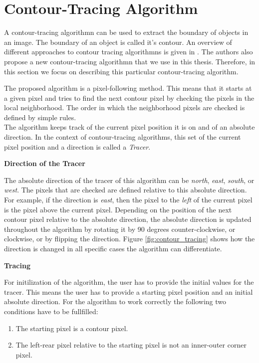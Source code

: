 \documentclass[thesis.tex]{subfiles}
\begin{document}
\section{Contour-Tracing Algorithm} 
\label{contourtracingalgorithm}
A contour-tracing algorithmn can be used to extract the boundary of objects in an image. The boundary of an object is called it's contour. An overview of different approaches to contour tracing algorithmns is given in \cite{seo2016fast}. The authors also propose a new contour-tracing algorithmn that we use in this thesis. Therefore, in this section we focus on describing this particular contour-tracing algorithm.

The proposed algorithm is a pixel-following method. This means that it starts at a given pixel and tries to find the next contour pixel by checking the pixels in the local neighborhood. The order in which the neighborhood pixels are checked is defined by simple rules. \\ The algorithm keeps track of the current pixel position it is on and of an absolute direction. In the context of contour-tracing algorithms, this set of the current pixel position and a direction is called a \textit{Tracer}. 

\textbf{Direction of the Tracer}

The absolute direction of the tracer of this algorithm can be \textit{north}, \textit{east}, \textit{south}, or \textit{west}. The pixels that are checked are defined relative to this absolute direction. For example, if the direction is \textit{east}, then the pixel to the \textit{left} of the current pixel is the pixel above the current pixel. Depending on the position of the next contour pixel relative to the absolute direction, the absolute direction is updated throughout the algorithm by rotating it by 90 degrees counter-clockwise, or clockwise, or by flipping the direction. Figure \ref{fig:contour_tracing} shows how the direction is changed in all specific cases the algorithm can differentiate.

\newpage
\textbf{Tracing}

For initilization of the algorithm, the user has to provide the initial values for the tracer. This means the user has to provide a starting pixel position and an initial absolute direction. For the algorithm to work correctly the following two conditions have to be fullfilled:
\begin{enumerate}
\item{The starting pixel is a contour pixel.}
\item{The left-rear pixel relative to the starting pixel is not an inner-outer corner pixel.}
\label{starting_pixel_conditions}
\end{enumerate}
  
\end{document}
